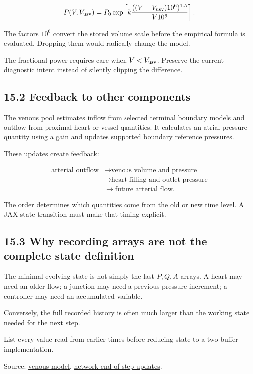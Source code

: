 \documentclass[11pt,a4paper]{article}
\begin{document}
\begingroup\small
\[
P(V,V_{\rm usv})=
P_0\exp\left[
k\frac{((V-V_{\rm usv})10^6)^{1.5}}{V10^6}
\right].
\]
\endgroup


The factors \(10^6\) convert the stored volume scale before the empirical formula is evaluated. Dropping them would radically change the model.

The fractional power requires care when \(V<V_{\rm usv}\). Preserve the current diagnostic intent instead of silently clipping the difference.

\subsection{15.2 Feedback to other components}
The venous pool estimates inflow from selected terminal boundary models and outflow from proximal heart or vessel quantities. It calculates an atrial-pressure quantity using a gain and updates supported boundary reference pressures.

These updates create feedback:


\begingroup\small
\[
\begin{aligned}
\text{arterial outflow}
&\longrightarrow\text{venous volume and pressure}\\
&\longrightarrow\text{heart filling and outlet pressure}\\
&\longrightarrow\text{future arterial flow}.
\end{aligned}
\]
\endgroup


The order determines which quantities come from the old or new time level. A JAX state transition must make that timing explicit.

\subsection{15.3 Why recording arrays are not the complete state definition}
The minimal evolving state is not simply the last \(P,Q,A\) arrays. A heart may need an older flow; a junction may need a previous pressure increment; a controller may need an accumulated variable.

Conversely, the full recorded history is often much larger than the working state needed for the next step.

List every value read from earlier times before reducing state to a two-buffer implementation.

Source: \href{/home/sadid/starfish/NetworkLib/classVenousPool.py}{venous model}, \href{/home/sadid/starfish/NetworkLib/classVascularNetwork.py}{network end-of-step updates}.
\end{document}
